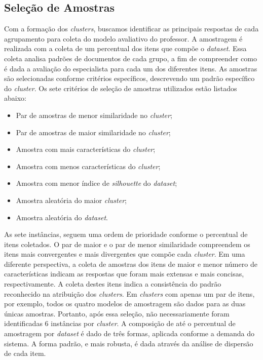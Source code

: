 \subsection{Seleção de Amostras}
\label{subsec-selecao-amostras}

Com a formação dos \textit{clusters}, buscamos identificar as principais respostas de cada agrupamento para coleta do modelo avaliativo do professor. A amostragem é realizada com a coleta de um percentual dos itens que compõe o \textit{dataset}. Essa coleta analisa padrões de documentos de cada grupo, a fim de compreender como é dada a avaliação do especialista para cada um dos diferentes itens. As amostras são selecionadas conforme critérios específicos, descrevendo um padrão específico do \textit{cluster}. Os sete critérios de seleção de amostras utilizados estão listados abaixo:

\begin{itemize}
	\item Par de amostras de menor similaridade no \textit{cluster};
	\item Par de amostras de maior similaridade no \textit{cluster};
	\item Amostra com mais características do \textit{cluster};
	\item Amostra com menos características do \textit{cluster};
	\item Amostra com menor índice de \textit{silhouette} do \textit{dataset};
	\item Amostra aleatória do maior \textit{cluster};
	\item Amostra aleatória do \textit{dataset}.
\end{itemize}

As sete instâncias, seguem uma ordem de prioridade conforme o percentual de itens coletados. O par de maior e o par de menor similaridade compreendem os itens mais convergentes e mais divergentes que compõe cada \textit{cluster}. Em uma diferente perspectiva, a coleta de amostras dos itens de maior e menor número de características indicam as respostas que foram mais extensas e mais concisas, respectivamente. A coleta destes itens indica a consistência do padrão reconhecido na atribuição dos \textit{clusters}. Em \textit{clusters} com apenas um par de itens, por exemplo, todos os quatro modelos de amostragem são dados para as duas únicas amostras. Portanto, após essa seleção, não necessariamente foram identificadas 6 instâncias por \textit{cluster}. A composição de até o percentual de amostragem por \textit{dataset} é dado de três formas, aplicada conforme a demanda do sistema. A forma padrão, e mais robusta, é dada através da análise de dispersão de cada item.

